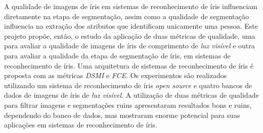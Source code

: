 A qualidade de imagens de íris em sistemas de reconhecimento de íris influenciam diretamente na etapa de segmentação, assim como a qualidade de segmentação influencia na extração dos atributos que identificam unicamente uma pessoa.  Este projeto propõe, então, o estudo da aplicação de duas métricas de qualidade, uma para avaliar a qualidade de imagens de íris de comprimento de \textit{luz visível} e outra para avaliar a qualidade da etapa de segmentação de íris, em sistemas de reconhecimento de íris. Uma arquitetura de sistemas de reconhecimento de íris é proposta com as métricas \textit{\acrfull{DSMI}} e \textit{\acrfull{FCE}}. Os experimentos são realizados utilizando um sistema de reconhecimento de íris \textit{open source} e quatro bancos de dados de imagens de íris de \textit{luz visível}. A utilização de duas métricas de qualidade para filtrar imagens e segmentações ruins apresentaram resultados bons e ruins, dependendo do banco de dados, mas mostraram enorme potencial para suas aplicações em sistemas de reconhecimento de íris.

